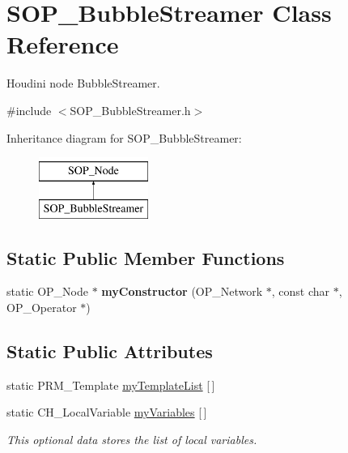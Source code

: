 \hypertarget{class_s_o_p___bubble_streamer}{}\section{S\+O\+P\+\_\+\+Bubble\+Streamer Class Reference}
\label{class_s_o_p___bubble_streamer}


Houdini node Bubble\+Streamer.  




{\ttfamily \#include $<$S\+O\+P\+\_\+\+Bubble\+Streamer.\+h$>$}

Inheritance diagram for S\+O\+P\+\_\+\+Bubble\+Streamer\+:\begin{figure}[H]
\begin{center}
\leavevmode
\includegraphics[height=2.000000cm]{class_s_o_p___bubble_streamer}
\end{center}
\end{figure}
\subsection*{Static Public Member Functions}
\begin{DoxyCompactItemize}
\item 
\hypertarget{class_s_o_p___bubble_streamer_a6b0e475f3066f02279547ab0984107c8}{}static O\+P\+\_\+\+Node $\ast$ {\bfseries my\+Constructor} (O\+P\+\_\+\+Network $\ast$, const char $\ast$, O\+P\+\_\+\+Operator $\ast$)\label{class_s_o_p___bubble_streamer_a6b0e475f3066f02279547ab0984107c8}

\end{DoxyCompactItemize}
\subsection*{Static Public Attributes}
\begin{DoxyCompactItemize}
\item 
static P\+R\+M\+\_\+\+Template \hyperlink{class_s_o_p___bubble_streamer_a449d06bab1f64b11f0cfea2565a7ed2a}{my\+Template\+List} \mbox{[}$\,$\mbox{]}
\item 
static C\+H\+\_\+\+Local\+Variable \hyperlink{class_s_o_p___bubble_streamer_a0e2f6d167c4c5622b57ac21ba617fce4}{my\+Variables} \mbox{[}$\,$\mbox{]}
\begin{DoxyCompactList}\small\item\em This optional data stores the list of local variables. \end{DoxyCompactList}\end{DoxyCompactItemize}
